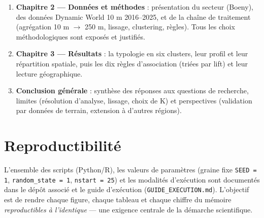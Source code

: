 \begin{enumerate}
  \item \textbf{Chapitre 2 — Données et méthodes} : présentation du secteur
        (Boeny), des données Dynamic World 10 m 2016--2025, et de la chaîne de
        traitement (agrégation 10 m $\rightarrow$ 250 m, lissage, clustering,
        règles). Tous les choix méthodologiques sont exposés et justifiés.
  \item \textbf{Chapitre 3 — Résultats} : la typologie en six clusters, leur
        profil et leur répartition spatiale, puis les dix règles d'association
        (triées par lift) et leur lecture géographique.
  \item \textbf{Conclusion générale} : synthèse des réponses aux questions de
        recherche, limites (résolution d'analyse, lissage, choix de K) et
        perspectives (validation par données de terrain, extension à d'autres
        régions).
\end{enumerate}

\section{Reproductibilité}

L'ensemble des scripts (Python/R), les valeurs de paramètres (graine fixe
\texttt{SEED = 1}, \texttt{random\_state = 1}, \texttt{nstart = 25}) et les
modalités d'exécution sont documentés dans le dépôt associé et le guide
d'exécution (\texttt{GUIDE\_EXECUTION.md}). L'objectif est de rendre chaque
figure, chaque tableau et chaque chiffre du mémoire \emph{reproductibles à
l'identique} — une exigence centrale de la démarche scientifique.
